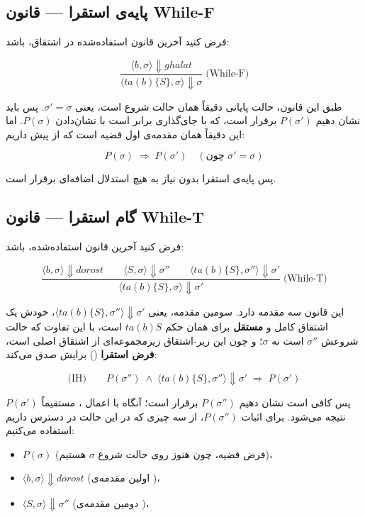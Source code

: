 \documentclass[12pt]{report}
\begin{document}
	\subsection{پایه‌ی استقرا --- قانون While-F}
	
	فرض کنید آخرین قانون استفاده‌شده در اشتقاق،  باشد:
	
	\[
	\dfrac{\langle b,\sigma\rangle \Downarrow \mathit{ghalat}}
	{\langle \mathit{ta}(b)\{S\},\sigma\rangle \Downarrow \sigma}\;\text{(While-F)}
	\]
	
	طبق این قانون، حالت پایانی دقیقاً همان حالت شروع است، یعنی $\sigma' = \sigma$. پس باید نشان دهیم $P(\sigma')$ برقرار است، که با جای‌گذاری برابر است با نشان‌دادن $P(\sigma)$. اما این دقیقاً همان مقدمه‌ی اول قضیه است که از پیش داریم:
	
	\[
	P(\sigma) \;\Rightarrow\; P(\sigma') \quad (\text{چون } \sigma'=\sigma)
	\]
	
	پس پایه‌ی استقرا بدون نیاز به هیچ استدلال اضافه‌ای برقرار است.
	
	\subsection{گام استقرا --- قانون While-T}
	
	فرض کنید آخرین قانون استفاده‌شده،  باشد:
	
	\[
	\dfrac{\langle b,\sigma\rangle \Downarrow \mathit{dorost}
		\qquad \langle S,\sigma\rangle \Downarrow \sigma''
		\qquad \langle \mathit{ta}(b)\{S\},\sigma''\rangle \Downarrow \sigma'}
	{\langle \mathit{ta}(b)\{S\},\sigma\rangle \Downarrow \sigma'}\;\text{(While-T)}
	\]
	
	این قانون سه مقدمه دارد. سومین مقدمه، یعنی $\langle \mathit{ta}(b)\{S\},\sigma''\rangle \Downarrow \sigma'$، خودش یک اشتقاق کامل و \textbf{مستقل} برای همان حکم $ ta (b) {S} $ است، با این تفاوت که حالت شروعش $\sigma''$ است نه $\sigma$؛ و چون این زیر\nobreakdash-اشتقاق زیرمجموعه‌ای از اشتقاق اصلی است، \textbf{فرض استقرا} () برایش صدق می‌کند:
	
	\[
	\text{(IH)}\qquad P(\sigma'') \;\land\; \langle \mathit{ta}(b)\{S\},\sigma''\rangle \Downarrow \sigma' \;\Rightarrow\; P(\sigma')
	\]
	
	پس کافی است نشان دهیم $P(\sigma'')$ برقرار است؛ آنگاه با اعمال ، مستقیماً $P(\sigma')$ نتیجه می‌شود. برای اثبات $P(\sigma'')$، از سه چیزی که در این حالت در دسترس داریم استفاده می‌کنیم:
	
	\begin{itemize}
		\item $P(\sigma)$ (فرض قضیه، چون هنوز روی حالت شروع $\sigma$ هستیم)،
		\item $\langle b,\sigma\rangle \Downarrow \mathit{dorost}$ (اولین مقدمه‌ی )،
		\item $\langle S,\sigma\rangle \Downarrow \sigma''$ (دومین مقدمه‌ی )،
	\end{itemize}
	
\end{document}
